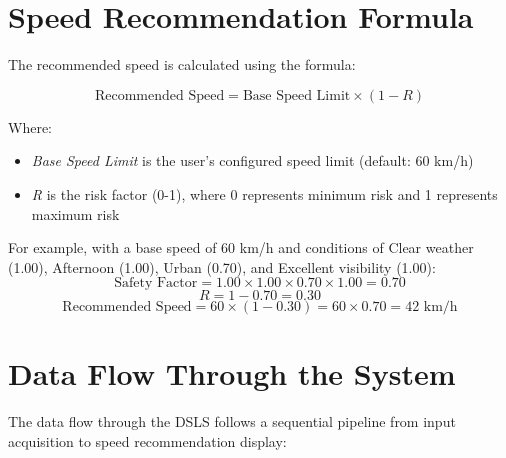 \section{Speed Recommendation Formula}
The recommended speed is calculated using the formula:

\begin{equation}
\text{Recommended Speed} = \text{Base Speed Limit} \times (1 - R)
\end{equation}

Where:
\begin{itemize}
    \item \textit{Base Speed Limit} is the user's configured speed limit (default: 60 km/h)
    \item \textit{R} is the risk factor (0-1), where 0 represents minimum risk and 1 represents maximum risk
\end{itemize}

For example, with a base speed of 60 km/h and conditions of Clear weather (1.00), Afternoon (1.00), Urban (0.70), and Excellent visibility (1.00):
\begin{equation}
\text{Safety Factor} = 1.00 \times 1.00 \times 0.70 \times 1.00 = 0.70
\end{equation}
\begin{equation}
R = 1 - 0.70 = 0.30
\end{equation}
\begin{equation}
\text{Recommended Speed} = 60 \times (1 - 0.30) = 60 \times 0.70 = 42 \text{ km/h}
\end{equation}

\section{Data Flow Through the System}
The data flow through the DSLS follows a sequential pipeline from input acquisition to speed recommendation display:

